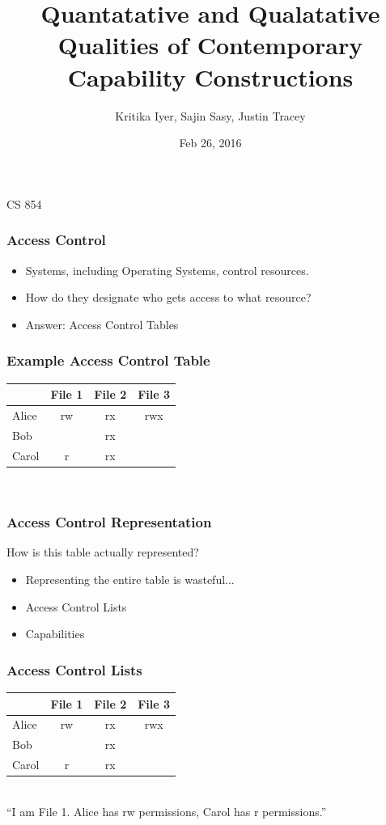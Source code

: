 \documentclass[xcolor=table]{beamer}
\title{Quantatative and Qualatative Qualities of Contemporary Capability Constructions}
\date{Feb 26, 2016}
\author{Kritika Iyer, Sajin Sasy, Justin Tracey}
\begin{document}
\begin{frame}
  \titlepage
  \centering
  CS 854
\end{frame}

\begin{frame}
  \frametitle{Access Control}
  \begin{itemize}
  \item Systems, including Operating Systems, control resources.
  \item How do they designate who gets access to what resource?
  \item Answer: Access Control Tables
  \end{itemize}
\end{frame}

\begin{frame}
  \frametitle{Example Access Control Table}
  \begin{center}
    \begin{tabular}{|l||c|c|c|}
      \hline
      &File 1&File 2&File 3\\
      \hline
      \hline
      Alice&rw&rx&rwx\\
      \hline
      Bob&&rx&\\
      \hline
      Carol&r&rx&\\
      \hline
    \end{tabular}\\
    \vspace{10pt}
  \end{center}
\end{frame}

\begin{frame}
  \frametitle{Access Control Representation}
  How is this table actually represented?
  \begin{itemize}
  \item Representing the entire table is wasteful... \pause
  \item Access Control Lists
  \item Capabilities
  \end{itemize}
\end{frame}

\begin{frame}
  \frametitle{Access Control Lists}
  \begin{center}
    \begin{tabular}{|l||c|c|c|}
      \hline
      &\cellcolor{green}File 1&File 2&File 3\\
      \hline
      \hline
      Alice&\cellcolor{green}rw&rx&rwx\\
      \hline
      Bob&\cellcolor{green}&rx&\\
      \hline
      Carol&\cellcolor{green}r&rx&\\
      \hline
    \end{tabular}\\
    \vspace{10pt}
    ``I am File 1. Alice has rw permissions, Carol has r permissions.''
  \end{center}
\end{frame}
\end{document}
